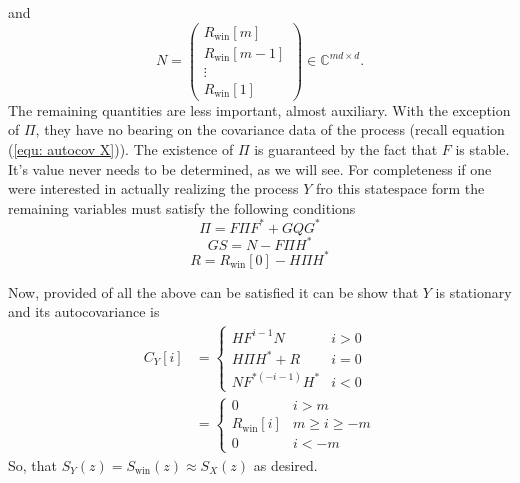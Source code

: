 \documentclass[12pt]{amsart}
\newcommand{\C}{\mathbb{C}}
\begin{document}
and
$$N = \begin{pmatrix} R_\text{win}[m] \\ R_\text{win}[m-1] \\ \vdots \\ R_\text{win}[1] \end{pmatrix}\in \C^{md\times d}.$$ 
The remaining quantities are less important, almost auxiliary. With the exception of $\Pi$, they have no bearing on the covariance data of the process (recall equation (\ref{equ: autocov X})). The existence of $\Pi$ is guaranteed by the fact that $F$ is stable. It's value never needs to be determined, as we will see. For completeness if one were interested in actually realizing the process $Y$ fro this statespace form the remaining variables must satisfy the following conditions
$$\Pi = F\Pi F^* + GQG^*$$
$$GS = N - F\Pi H^*$$
$$R = R_\text{win}[0] - H\Pi H^*$$
 
Now, provided of all the above can be satisfied it can be show that $Y$ is stationary and its autocovariance is
\begin{align*}
	C_{Y}[i] &= \begin{cases}
		HF^{i-1}N & i > 0 \\
		H\Pi H^* + R & i = 0 \\
		NF^{*(-i-1)}H^* & i < 0
	\end{cases} \\
	&=\begin{cases}
		0 & i > m \\
		R_\text{win}[i]& m \ge i \ge -m \\
		0 & i < -m
	\end{cases} 
\end{align*}
So, that $S_Y(z) = S_{\text{win}}(z) \approx S_X(z)$ as desired. 
\end{document}

